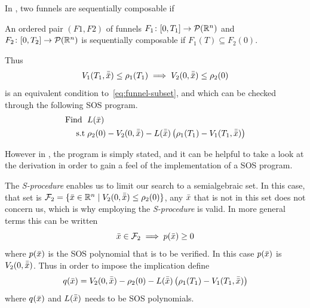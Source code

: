 In \cite[Majumdar and Tedrake, p.~47]{majumdarFunnelLibrariesRealtime2017}, two
funnels are sequentially composable if
\begin{definition}
  \label{def:funnel-composition}
  An ordered pair \((F1, F2)\) of funnels \(F_1 \colon [0,T_1] \rightarrow
  \mathcal{P}(\mathbb{R}^n)\) and \(F_2 \colon [0,T_2] \rightarrow \mathcal{P}(\mathbb{R}^n)\)
  is sequentially composable if \(F_1(T) \subseteq F_2(0)\).
\end{definition}

Thus
\[
  V_1(T_1,\bar{\bar{x}}) \leq \rho_1(T_1) \implies V_2(0,\bar{\bar{x}}) \leq \rho_2(0)
\]
is an equivalent condition to~\cref{eq:funnel-subset}, and which can be checked
through the following \ac{SOS} program.
\begin{align*}
  \text{Find } \; &L(\bar{x}) \\
  \text{s.t} \; &\rho_2(0) - V_2(0,\bar{\bar{x}}) - L(\bar{\bar{x}})
                  \left( \rho_1(T_1) - V_1(T_1,\bar{\bar{x}}) \right)
\end{align*}
\cite[Majumdar and Tedrake, p.~54]{majumdarFunnelLibrariesRealtime2017}

However in \cite[Majumdar and Tedrake]{majumdarFunnelLibrariesRealtime2017}, the
program is simply stated, and it can be helpful to take a look at the derivation
in order to gain a feel of the implementation of a \ac{SOS} program.

The \textit{S-procedure} enables us to limit our search to a semialgebraic set.
In this case, that set is \(\mathcal{F}_2 = \lbrace\bar{x} \in \mathbb{R}^n \mid
  V_2(0,\bar{\bar{x}}) \leq \rho_2(0)\rbrace\), any \(\bar{x}\) that is not in this set does not
concern us, which is why employing the \textit{S-procedure} is valid. In more
general terms this can be written
\[
  \bar{x} \in \mathcal{F}_2 \implies p(\bar{x}) \geq 0
\]
where \(p(\bar{x})\) is the \ac{SOS} polynomial that is to be verified. In this case
\(p(\bar{x})\) is \(V_2(0,\bar{\bar{x}})\). Thus in order to impose the implication define
\[
  q(\bar{x}) = V_2(0,\bar{\bar{x}}) - \rho_2(0) - L(\bar{\bar{x}}) \left( \rho_1(T_1) -
    V_1(T_1,\bar{\bar{x}}) \right)
\]
where \(q(\bar{x})\) and \(L(\bar{\bar{x}})\) needs to be SOS polynomials.

